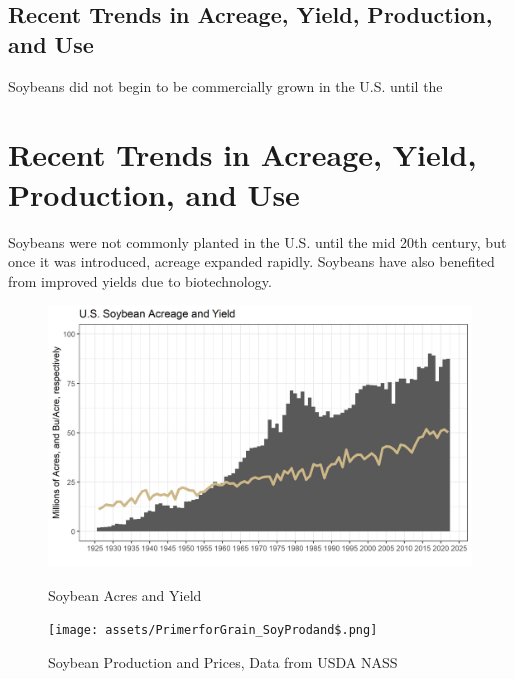 \documentclass[
  letterpaper,
  DIV=11,
  numbers=noendperiod]{scrreprt}
\begin{document}
\hypertarget{recent-trends-in-acreage-yield-production-and-use}{%
\subsection{Recent Trends in Acreage, Yield, Production, and
Use}\label{recent-trends-in-acreage-yield-production-and-use}}

Soybeans did not begin to be commercially grown in the U.S. until the

\hypertarget{recent-trends-in-acreage-yield-production-and-use-1}{%
\section{Recent Trends in Acreage, Yield, Production, and
Use}\label{recent-trends-in-acreage-yield-production-and-use-1}}

Soybeans were not commonly planted in the U.S. until the mid 20th
century, but once it was introduced, acreage expanded rapidly. Soybeans
have also benefited from improved yields due to biotechnology.

\begin{figure}

{\centering 

\href{Soybean\%20Acres\%20and\%20Yield,\%20Data\%20from\%20USDA\%20NASS}{\includegraphics{assets/PrimerforGrain_SoyAcandY.png}}

}

\caption{Soybean Acres and Yield}

\end{figure}

\begin{figure}

{\centering \texttt{[image: assets/PrimerforGrain\_SoyProdand\$.png]}

}

\caption{Soybean Production and Prices, Data from USDA NASS}

\end{figure}
\end{document}
